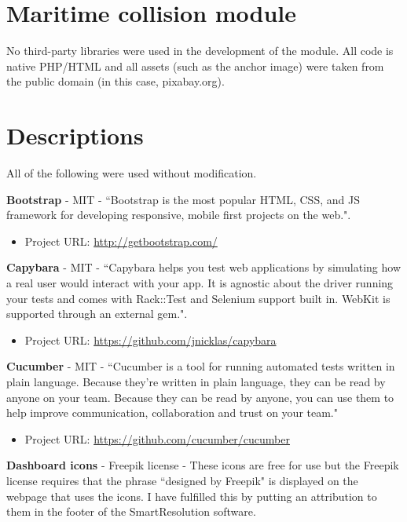 \section{Maritime collision module}

No third-party libraries were used in the development of the module. All code is native PHP/HTML and all assets (such as the anchor image) were taken from the public domain (in this case, pixabay.org).

\section{Descriptions}

All of the following were used without modification.

\textbf{Bootstrap} - MIT - ``Bootstrap is the most popular HTML, CSS, and JS framework for developing responsive, mobile first projects on the web.".

\begin{itemize}
\item Project URL: \url{http://getbootstrap.com/}
\end{itemize}

\textbf{Capybara} - MIT - ``Capybara helps you test web applications by simulating how a real user would interact with your app. It is agnostic about the driver running your tests and comes with Rack::Test and Selenium support built in. WebKit is supported through an external gem.". 

\begin{itemize}
\item Project URL: \url{https://github.com/jnicklas/capybara}
\end{itemize}

\textbf{Cucumber} - MIT - ``Cucumber is a tool for running automated tests written in plain language. Because they're written in plain language, they can be read by anyone on your team. Because they can be read by anyone, you can use them to help improve communication, collaboration and trust on your team."

\begin{itemize}
\item Project URL: \url{https://github.com/cucumber/cucumber}
\end{itemize}

\textbf{Dashboard icons} - Freepik license - These icons are free for use but the Freepik license requires that the phrase ``designed by Freepik" is displayed on the webpage that uses the icons. I have fulfilled this by putting an attribution to them in the footer of the SmartResolution software.

